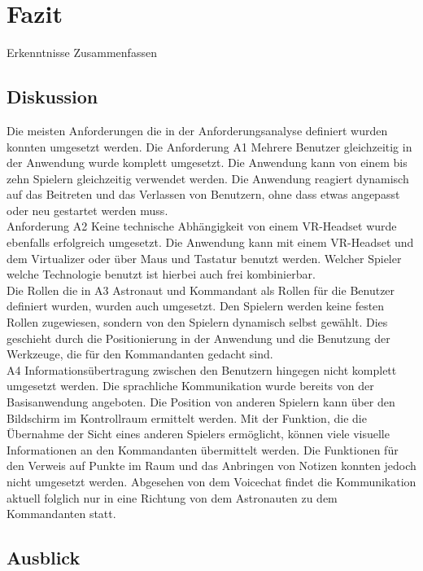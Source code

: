 \section{Fazit}
Erkenntnisse Zusammenfassen 

\subsection{Diskussion} \label{Diskussion}

Die meisten Anforderungen die in der Anforderungsanalyse definiert wurden konnten umgesetzt werden. Die Anforderung A1 \glqq Mehrere Benutzer gleichzeitig in der Anwendung\grqq{} wurde komplett umgesetzt. Die Anwendung kann von einem bis zehn Spielern gleichzeitig verwendet werden. Die Anwendung reagiert dynamisch auf das Beitreten und das Verlassen von Benutzern, ohne dass etwas angepasst oder neu gestartet werden muss.\\
Anforderung A2 \glqq Keine technische Abhängigkeit von einem VR-Headset\grqq{} wurde ebenfalls erfolgreich umgesetzt. Die Anwendung kann mit einem VR-Headset und dem Virtualizer oder über Maus und Tastatur benutzt werden. Welcher Spieler welche Technologie benutzt ist hierbei auch frei kombinierbar.\\
Die Rollen die in A3 \glqq Astronaut und Kommandant als Rollen für die Benutzer\grqq{} definiert wurden, wurden auch umgesetzt. Den Spielern werden keine festen Rollen zugewiesen, sondern von den Spielern dynamisch selbst gewählt. Dies geschieht durch die Positionierung in der Anwendung und die Benutzung der Werkzeuge, die für den Kommandanten gedacht sind.\\
A4 \glqq Informationsübertragung zwischen den Benutzern\grqq{} hingegen nicht komplett umgesetzt werden. Die sprachliche Kommunikation wurde bereits von der Basisanwendung angeboten. Die Position von anderen Spielern kann über den Bildschirm im Kontrollraum ermittelt werden. Mit der Funktion, die die Übernahme der Sicht eines anderen Spielers ermöglicht, können viele visuelle Informationen an den Kommandanten übermittelt werden. Die Funktionen für den Verweis auf Punkte im Raum und das Anbringen von Notizen konnten jedoch nicht umgesetzt werden. Abgesehen von dem Voicechat findet die Kommunikation aktuell folglich nur in eine Richtung von dem Astronauten zu dem Kommandanten statt.

\subsection{Ausblick} \label{Ausblick}

